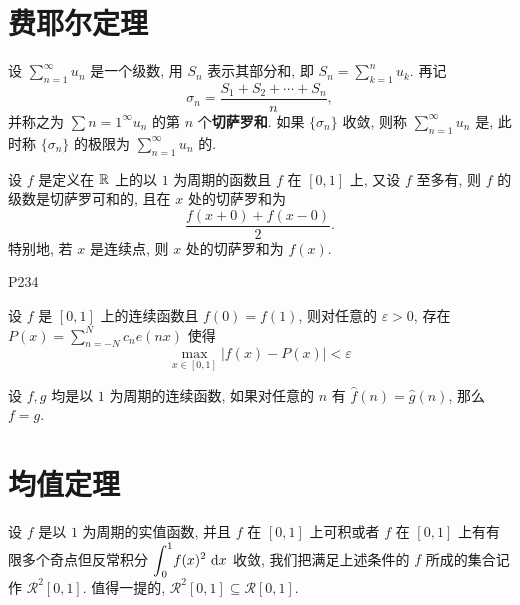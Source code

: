 \begin{practice}
	\problem 
\end{practice}

\section{费耶尔定理}

\begin{definition}
	设 $\sum\limits_{n=1}^\infty u_n$ 是一个级数, 用 $S_n$ 表示其部分和, 即 $S_n=\sum\limits_{k=1}^n u_k$. 再记 $$\sigma_n=\frac{S_1+S_2+\cdots+S_n}n,$$ 并称之为 $\sum\limits{n=1}^\infty u_n$ 的第 $n$ 个\textbf{切萨罗和}. 如果 $\{\sigma_n\}$ 收敛, 则称 $\sum\limits_{n=1}^\infty u_n$ 是, 此时称 $\{\sigma_n\}$ 的极限为 $\sum\limits_{n=1}^\infty u_n$ 的.
\end{definition}

\begin{theorem}[费耶尔]
	设 $f$ 是定义在 $\R$ 上的以 $1$ 为周期的函数且 $f$ 在 $[0,1]$ 上, 又设 $f$ 至多有, 则 $f$ 的 \fly 级数是切萨罗可和的, 且在 $x$ 处的切萨罗和为 $$\frac{f(x+0)+f(x-0)}2.$$ 特别地, 若 $x$ 是连续点, 则 $x$ 处的切萨罗和为 $f(x)$.
\end{theorem}

\begin{remark*}
	P234
\end{remark*}

\begin{theorem}
	设 $f$ 是 $[0,1]$ 上的连续函数且 $f(0)=f(1)$, 则对任意的 $\varepsilon>0$, 存在 $P(x)=\sum\limits_{n=-N}^N c_ne(nx)$ 使得 $$\max\limits_{x\in[0,1]}|f(x)-P(x)|<\varepsilon$$ 
\end{theorem}

\begin{proposition}
	设 $f,g$ 均是以 $1$ 为周期的连续函数, 如果对任意的 $n$ 有 $\hat f(n)=\hat g(n)$, 那么 $f=g$.
\end{proposition}

\section{均值定理}

\renewcommand{\tiaojian}{设 $f$ 以 $1$ 为周期且 $f\in\mathscr{R}^2[0,1]$}

\begin{definition}
	设 $f$ 是以 $1$ 为周期的实值函数, 并且 $f$ 在 $[0,1]$ 上可积或者 $f$ 在 $[0,1]$ 上有有限多个奇点但反常积分 $\mint[0]^1 f(x)^2\td x$ 收敛, 我们把满足上述条件的 $f$ 所成的集合记作 $\mathscr{R}^2[0,1]$. 值得一提的, $\mathscr{R}^2[0,1]\subseteq\mathscr{R}[0,1]$.
\end{definition}

